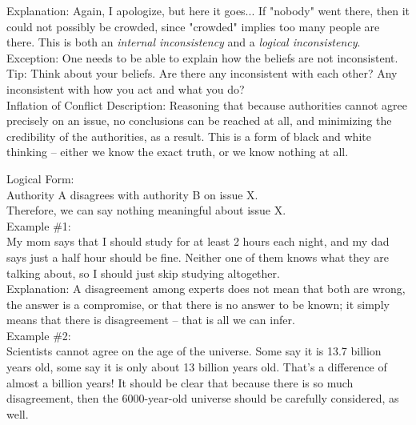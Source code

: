 \documentclass[a4paper,12pt,single,pdftex]{scrbook}
\begin{document}
    
      Explanation: Again, I apologize, but here it goes... If "nobody" went there, then it could not possibly be crowded, since "crowded" implies too many people are there. This is both an {\it internal inconsistency} and a {\it logical inconsistency}.
    \\

    
      Exception: One needs to be able to explain how the beliefs are not inconsistent.
    \\

    
      Tip: Think about your beliefs.  Are there any inconsistent with each other?  Any inconsistent with how you act and what you do?
    \\

  

Inflation of Conflict
    Description: Reasoning that because authorities cannot agree precisely on an issue, no conclusions can be reached at all, and minimizing the credibility of the authorities, as a result.  This is a form of black and white thinking -- either we know the exact truth, or we know nothing at all. 

    
      Logical Form:
    \\

    
      Authority A disagrees with authority B on issue X.
    \\

    
      Therefore, we can say nothing meaningful about issue X.
    \\

    
      Example \#1:
    \\

    
      My mom says that I should study for at least 2 hours each night, and my dad says just a half hour should be fine.  Neither one of them knows what they are talking about, so I should just skip studying altogether.
    \\

    
      Explanation: A disagreement among experts does not mean that both are wrong, the answer is a compromise, or that there is no answer to be known; it simply means that there is disagreement -- that is all we can infer.
    \\

    
      Example \#2:
    \\

    
      Scientists cannot agree on the age of the universe.  Some say it is 13.7 billion years old, some say it is only about 13 billion years old.  That’s a difference of almost a billion years!  It should be clear that because there is so much disagreement, then the 6000-year-old universe should be carefully considered, as well.
    \\
\end{document}
